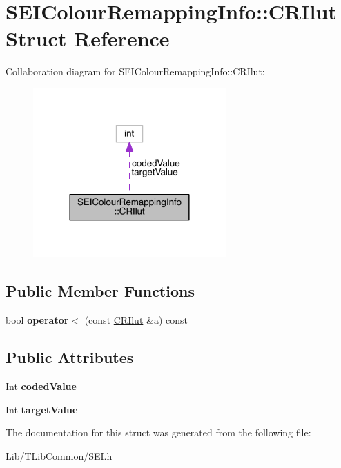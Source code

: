 \hypertarget{struct_s_e_i_colour_remapping_info_1_1_c_r_ilut}{}\section{S\+E\+I\+Colour\+Remapping\+Info\+:\+:C\+R\+Ilut Struct Reference}
\label{struct_s_e_i_colour_remapping_info_1_1_c_r_ilut}


Collaboration diagram for S\+E\+I\+Colour\+Remapping\+Info\+:\+:C\+R\+Ilut\+:
\nopagebreak
\begin{figure}[H]
\begin{center}
\leavevmode
\includegraphics[width=209pt]{db/d03/struct_s_e_i_colour_remapping_info_1_1_c_r_ilut__coll__graph}
\end{center}
\end{figure}
\subsection*{Public Member Functions}
\begin{DoxyCompactItemize}
\item 
\mbox{\label{struct_s_e_i_colour_remapping_info_1_1_c_r_ilut_a447dec24e005e671b40f655b2ad0cb16}} 
bool {\bfseries operator$<$} (const \hyperlink{struct_s_e_i_colour_remapping_info_1_1_c_r_ilut}{C\+R\+Ilut} \&a) const
\end{DoxyCompactItemize}
\subsection*{Public Attributes}
\begin{DoxyCompactItemize}
\item 
\mbox{\label{struct_s_e_i_colour_remapping_info_1_1_c_r_ilut_aff58175db1e95e725b85f43b0c8147a5}} 
Int {\bfseries coded\+Value}
\item 
\mbox{\label{struct_s_e_i_colour_remapping_info_1_1_c_r_ilut_a860344f95eb09395c962d79aaff2cb65}} 
Int {\bfseries target\+Value}
\end{DoxyCompactItemize}


The documentation for this struct was generated from the following file\+:\begin{DoxyCompactItemize}
\item 
Lib/\+T\+Lib\+Common/S\+E\+I.\+h\end{DoxyCompactItemize}
